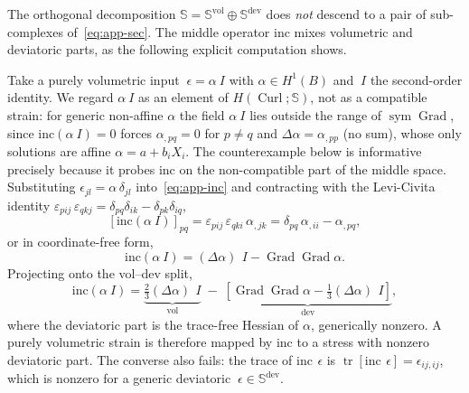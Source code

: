 \documentclass[12pt]{article}
\newcommand{\Syms}{\mathbb{S}}
\newcommand{\supvol}{^{\mathrm{vol}}}
\newcommand{\supdev}{^{\mathrm{dev}}}
\newcommand{\Symsd}{\mathbb{S}\supdev}
\DeclareMathOperator{\trace}{tr}
\DeclareMathOperator{\dev}{dev}
\DeclareMathOperator{\vol}{vol}
\DeclareMathOperator{\Grad}{Grad}
\DeclareMathOperator{\Curl}{Curl}
\DeclareMathOperator{\sym}{sym}
\begin{document}
The orthogonal decomposition $\Syms = \Syms\supvol \oplus \Symsd$
does \emph{not} descend to a pair of sub-complexes of~\eqref{eq:app-sec}.
The middle operator $\mathrm{inc}$ mixes volumetric and deviatoric
parts, as the following explicit computation shows.

Take a purely volumetric input $~\epsilon = \alpha ~I$ with
$\alpha \in H^1(B)$ and $~I$ the second-order identity. We regard
$\alpha~I$ as an element of $H(\Curl; \Syms)$, not as a compatible
strain: for generic non-affine $\alpha$ the field $\alpha~I$ lies
outside the range of $\sym\Grad$, since
$\mathrm{inc}(\alpha~I) = 0$ forces $\alpha_{,pq} = 0$ for $p \neq q$
and $\Delta\alpha = \alpha_{,pp}$ (no sum), whose only solutions are
affine $\alpha = a + b_i X_i$. The counterexample below is
informative precisely because it probes $\mathrm{inc}$ on the
non-compatible part of the middle space. Substituting
$\epsilon_{jl} = \alpha\,\delta_{jl}$ into~\eqref{eq:app-inc} and
contracting with the Levi-Civita identity
$\varepsilon_{pij}\,\varepsilon_{qkj} = \delta_{pq}\delta_{ik} -
\delta_{pk}\delta_{iq}$,
\begin{equation}
  \label{eq:app-inc-vol}
  \left[\mathrm{inc}(\alpha~I)\right]_{pq}
  =
  \varepsilon_{pij}\,\varepsilon_{qki}\,\alpha_{,jk}
  =
  \delta_{pq}\,\alpha_{,ii} - \alpha_{,pq},
\end{equation}
or in coordinate-free form,
\begin{equation}
  \label{eq:app-inc-vol-cf}
  \mathrm{inc}(\alpha ~I)
  = (\Delta \alpha)\, ~I - \Grad\Grad\alpha.
\end{equation}
Projecting onto the vol--dev split,
\begin{equation}
  \label{eq:app-inc-vol-split}
  \mathrm{inc}(\alpha ~I)
  = \underbrace{\tfrac{2}{3}(\Delta\alpha)\,~I}_{\vol}
  \;-\;
  \underbrace{\!\left[\Grad\Grad\alpha - \tfrac{1}{3}(\Delta\alpha)\,~I\right]\!}_{\dev},
\end{equation}
where the deviatoric part is the trace-free Hessian of $\alpha$,
generically nonzero. A purely volumetric strain is therefore mapped
by $\mathrm{inc}$ to a stress with nonzero deviatoric part. The
converse also fails: the trace of $\mathrm{inc}\,~\epsilon$ is
$\trace[\mathrm{inc}\,~\epsilon] = \epsilon_{ij,ij}$, which is
nonzero for a generic deviatoric $~\epsilon \in \Symsd$.
\end{document}
